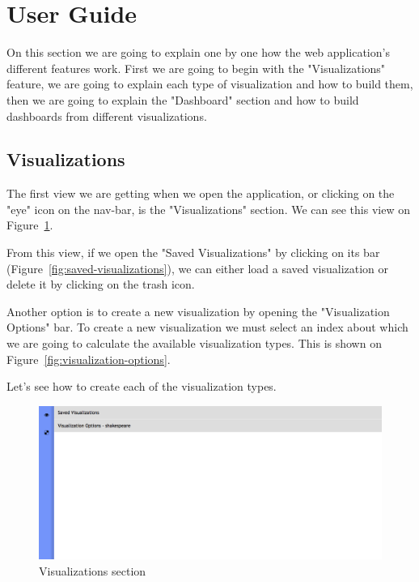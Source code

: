 \documentclass[a4paper, 12pt, english]{book}
\begin{document}
\section{User Guide}
\label{sec:results-user-guide}
On this section we are going to explain one by one how the web application's different features work. First we are going to begin with the "Visualizations" feature, we are going to explain each type of visualization and how to build them, then we are going to explain the "Dashboard" section and how to build dashboards from different visualizations.

\subsection{Visualizations}
\label{sec:results-visualizations}
The first view we are getting when we open the application, or clicking on the "eye" icon on the nav-bar, is the "Visualizations" section. We can see this view on Figure~\ref{fig:visualizations-section}.

From this view, if we open the "Saved Visualizations" by clicking on its bar (Figure~\ref{fig:saved-visualizations}),  we can either load a saved visualization or delete it by clicking on the trash icon.

Another option is to create a new visualization by opening the "Visualization Options" bar. To create a new visualization we must select an index about which we are going to calculate the available visualization types. This is shown on Figure~\ref{fig:visualization-options}.

Let's see how to create each of the visualization types.

\begin{figure}
  \centering
  \includegraphics[width=13cm, keepaspectratio]{img/visualizations-section}
  \caption{Visualizations section}
  \label{fig:visualizations-section}
\end{figure}
\end{document}
